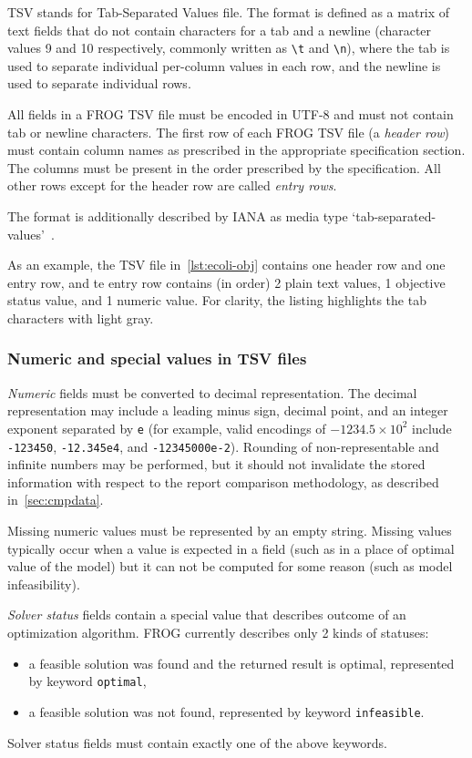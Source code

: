 TSV stands for Tab-Separated Values file. The format is defined as a matrix of text fields that do not contain characters for a tab and a newline (character values 9 and 10 respectively, commonly written as \verb|\t| and \verb|\n|), where the tab is used to separate individual per-column values in each row, and the newline is used to separate individual rows.

All fields in a FROG TSV file must be encoded in UTF-8 and must not contain tab or newline characters. The first row of each FROG TSV file (a \emph{header row}) must contain column names as prescribed in the appropriate specification section. The columns must be present in the order prescribed by the specification. All other rows except for the header row are called \emph{entry rows}.

The format is additionally described by IANA as media type `tab-separated-values'~\cite{ianatsv}.

As an example, the TSV file in~\cref{lst:ecoli-obj} contains one header row and one entry row, and te entry row contains (in order) 2 plain text values, 1 objective status value, and 1 numeric value. For clarity, the listing highlights the tab characters with light gray.

\subsubsection{Numeric and special values in TSV files}
\emph{Numeric} fields must be converted to decimal representation. The decimal representation may include a leading minus sign, decimal point, and an integer exponent separated by \verb|e| (for example, valid encodings of $-1234.5\times10^2$ include \verb|-123450|, \verb|-12.345e4|, and \verb|-12345000e-2|). Rounding of non-representable and infinite numbers may be performed, but it should not invalidate the stored information with respect to the report comparison methodology, as described in~\cref{sec:cmpdata}.

Missing numeric values must be represented by an empty string. Missing values typically occur when a value is expected in a field (such as in a place of optimal value of the model) but it can not be computed for some reason (such as model infeasibility).

\emph{Solver status} fields contain a special value that describes outcome of an optimization algorithm. FROG currently describes only 2 kinds of statuses:
\begin{itemize}
\item a feasible solution was found and the returned result is optimal, represented by keyword \verb|optimal|,
\item a feasible solution was not found, represented by keyword \verb|infeasible|.
\end{itemize}
Solver status fields must contain exactly one of the above keywords.

